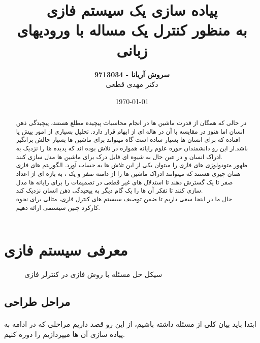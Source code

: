 \documentclass[12pt]{article}
\title{پیاده سازی یک سیستم فازی\\به منظور کنترل یک مساله با ورودیهای زبانی}
\author{
            \textbf{سروش آریانا - 9713034}
            \\
            دکتر مهدی قطعی
        }
\date{\today}
\begin{document}
\maketitle
\begin{abstract}
    در حالی که همگان از قدرت ماشین ها در انجام محاسبات پیچیده مطلع هستند، پیچیدگی ذهن انسان اما هنوز در مقایسه با آن در
    هاله ای از ابهام قرار دارد. تحلیل بسیاری از امور پیش پا افتاده که برای انسان ها بسیار ساده است گاه میتواند
    برای ماشین ها بسیار چالش برانگیز باشد.از این رو دانشمندان حوزه علوم رایانه همواره در تلاش بوده اند که پدیده
    ها را نزدیک به ادراک انسان و در عین حال به شیوه ای قابل
    درک برای ماشین ها مدل سازی کنند.\\ \indent{}
    ظهور متودولوژی های فازی را میتوان یکی از این تلاش ها به حساب آورد. الگوریتم های فازی همان چیزی هستند که
    میتوانند ادراک ماشین ها را از دامنه صفر و یک ، به بازه ای از اعداد صفر تا یک گسترش دهند تا
    استدلال های غیر قطعی در تصمیمات را برای رایانه ها مدل سازی کنند تا تفکر آن ها را یک گام دیگر به
    پیچیدگی ذهن انسان نزدیک کند.
    \\حال ما در اینجا سعی داریم تا ضمن توصیف سیستم های کنترل فازی، مثالی برای نحوه کارکرد چنین سیستمی ارائه دهیم.
\end{abstract}
\clearpage
\section{معرفی سیستم فازی}
\begin{figure}[H]
    \centering
    \begin{center}
    \end{center}
    \caption{سیکل حل مسئله با روش فازی در کنترلر فازی}
\end{figure}
\subsection{مراحل طراحی}

\paragraph{}
ابتدا باید بیان کلی از مسئله داشته باشیم، از این رو قصد داریم مراحلی که در ادامه به پیاده سازی آن ها میپردازیم را دوره کنیم.
\end{document}
